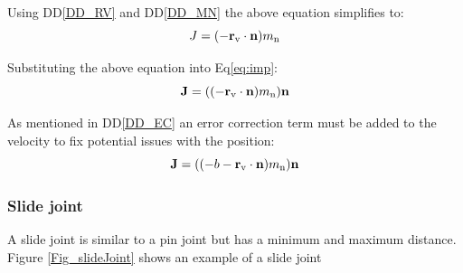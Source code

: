 \documentclass[12pt]{article}
\begin{document}
\noindent
Using DD\ref{DD_RV} and DD\ref{DD_MN} the above equation simplifies to: 
\begin{equation*}
J = (-\textbf r_\text{v}\cdot \textbf n)m_\text{n}
\end{equation*}

\noindent
Substituting the above equation into Eq\ref{eq:imp}:
\begin{equation*}
\textbf J = ((-\textbf r_\text{v}\cdot \textbf n)m_\text{n})\textbf n
\end{equation*}


\noindent
As mentioned in DD\ref{DD_EC} an error correction term must be added to the
velocity to fix potential issues with the position:
\begin{equation*}
\textbf J = ((-b -\textbf r_\text{v}\cdot \textbf n)m_\text{n})\textbf n
\end{equation*}

\subsubsection{Slide joint} \label{SecConstraintFig}
A slide joint is similar to a pin joint but has a minimum and maximum distance.
Figure \ref{Fig_slideJoint} shows an example of a slide joint
~\newline
\end{document}
